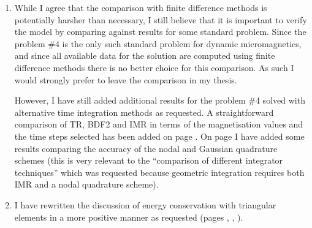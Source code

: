 \documentclass[12pt,a4paper,pdftex]{article}
\begin{document}
\begin{enumerate}
\item While I agree that the comparison with finite difference methods is potentially harsher than necessary, I still believe that it is important to verify the model by comparing against results for some standard problem.
Since the \mumag problem \#4 is the only such standard problem for dynamic micromagnetics, and since all available data for the solution are computed using finite difference methods there is no better choice for this comparison.
As such I would strongly prefer to leave the comparison in my thesis.

However, I have still added additional results for the \mumag problem \#4 solved with alternative time integration methods as requested.
A straightforward comparison of TR, BDF2 and IMR in terms of the magnetisation values and the time steps selected has been added on page \pageref{more-mumag4-correction-1}.
On page \pageref{more-mumag4-correction-2} I have added some results comparing the accuracy of the nodal and Gaussian quadrature schemes (this is very relevant to the ``comparison of different integrator techniques'' which was requested because geometric integration requires both IMR and a nodal quadrature scheme).

\item I have rewritten the discussion of energy conservation with triangular elements in a more positive manner as requested (pages \pageref{sec:triangular-meshes}, \pageref{sec:numer-experiments-conclusions}, \pageref{sec:future-work}).

\end{enumerate}

\end{document}
